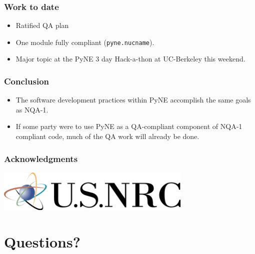 \documentclass[12pt]{beamer}
\begin{document}
\begin{frame}
\frametitle{Work to date}

\begin{itemize}
\item{Ratified QA plan}
\item{One module fully compliant (\texttt{pyne.nucname}).}
\item{Major topic at the PyNE 3 day Hack-a-thon at UC-Berkeley this weekend.}
\end{itemize}

\end{frame}
\begin{frame}
\frametitle{Conclusion}

\begin{itemize}
\item{The software development practices within PyNE accomplish the same goals as NQA-1.}
\item{If some party were to use PyNE as a QA-compliant component of NQA-1 compliant code, much of the QA work will already be done.}
\end{itemize}

\end{frame}
\begin{frame}[fragile]
\frametitle{Acknowledgments}

\includegraphics[height=2cm]{figures/NRClogo.png} \\

\end{frame}


\section*{Questions?}
\end{document}
